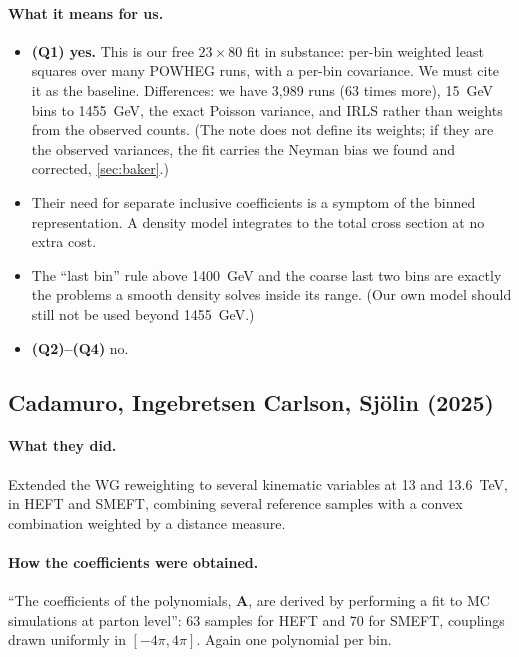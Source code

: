 \paragraph{What it means for us.}
\begin{itemize}
  \item \textbf{(Q1) yes.} This is our free $23\times80$ fit in substance: per-bin weighted
    least squares over many POWHEG runs, with a per-bin covariance. We must cite it as the
    baseline. Differences: we have 3,989 runs (63 times more), 15~GeV bins to 1455~GeV, the
    exact Poisson variance, and IRLS rather than weights from the observed counts. (The note
    does not define its weights; if they are the observed variances, the fit carries the
    Neyman bias we found and corrected, \cref{sec:baker}.)
  \item Their need for separate inclusive coefficients is a symptom of the binned
    representation. A density model integrates to the total cross section at no extra cost.
  \item The ``last bin'' rule above 1400~GeV and the coarse last two bins are exactly the
    problems a smooth density solves inside its range. (Our own model should still not be
    used beyond 1455~GeV.)
  \item \textbf{(Q2)--(Q4)} no.
\end{itemize}

\subsection{Cadamuro, Ingebretsen Carlson, Sj\"olin (2025) \cite{Cadamuro2025}}

\paragraph{What they did.} Extended the WG reweighting to several kinematic variables at 13
and 13.6~TeV, in HEFT and SMEFT, combining several reference samples with a convex
combination weighted by a distance measure.

\paragraph{How the coefficients were obtained.} ``The coefficients of the polynomials,
\textbf{A}, are derived by performing a fit to MC simulations at parton level'': 63 samples
for HEFT and 70 for SMEFT, couplings drawn uniformly in $[-4\pi,4\pi]$. Again one polynomial
per bin.

